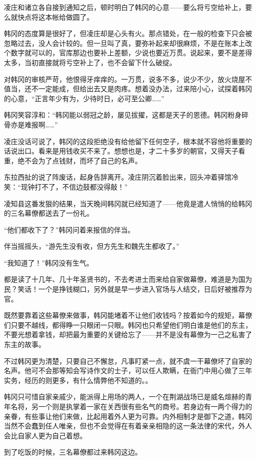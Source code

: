 凌庄和诸立各自接到通知之后，顿时明白了韩冈的心意——要么将亏空给补上，要么就快点将这本帐给做圆了。

韩冈的态度算是很好了，但凌庄却是心头有火。那点错处，在一般的检查下只会被忽略过去，没人会计较的。但一旦叫了真，要弥补起来却很麻烦，不是在账本上改个数字就可以的，官库那边也要补上差额，少说也要近万贯。说起来，要不是差得太多，当初直接就将亏空补上了，也不会留下什么破绽。

对韩冈的审核严苛，他恨得牙痒痒的。一万贯，说多不多，说少不少，放火烧屋不值当，还不一定能成，但给出去又是肉疼。想着没办法，过来陪小心，试探着韩冈的心意，“正言年少有为，少待时日，必可至公卿……”

韩冈笑容淳和：“韩冈能以弱冠之龄，屡见拔擢，这都是天子的恩德。韩冈粉身碎骨亦是难报啊……”

凌庄没话可说了，韩冈的这段拒绝没有给他留下任何空子，根本就不容他将重要的话说出口。看来是用钱收买不来了。想想也是，才二十多岁的朝官，又得天子看重，绝不会为了点钱财，而坏了自己的名声。

东拉西扯的说了阵废话，起身告辞离开。凌庄阴沉着脸出来，回头冲着驿馆冷笑：“现钟打不了，不信边鼓都没得敲！”

凌知县这番发狠的结果，当天晚间韩冈就已经知道了——他竟是遣人悄悄的给韩冈的三名幕僚都送去了一份礼。

“他们都收下了？”韩冈问着来报信的伴当。

伴当摇摇头，“游先生没有收，但方先生和魏先生都收了。”

“我知道了！”韩冈没有生气。

都是读了十几年、几十年圣贤书的，不去考进士而来给自家做幕僚，难道是为国为民？笑话！一个是挣钱糊口，另外就是早一步进入官场与人结交，日后好被推荐为官。

既然要靠着这些幕僚来做事，韩冈能堵着不让他们收钱吗？按着如今的规矩，幕僚们只要不越线，都得睁一只眼闭一只眼。韩冈也只希望他们明白谁是他们的东主，不要光想着拿钱，却把最为重要的关键给忘了——并不是没有幕僚为一己之私害了东主的故事。

不过韩冈更为清楚，只要自己不懈怠，凡事盯紧一点，就不虞一干幕僚坏了自家的名声。他可不会那等知会写诗作文的士子，可以任人欺瞒，在衙门中用心做了三年实务，经历的则更多，有什么情弊他不知道的。。

韩冈只可惜自家亲戚少，能派得上用场的两人，一个在荆湖战场已是威名煊赫的青年名将，另一个则是执掌着一家在关西很有些名气的商号。若身边有一两个得力的亲眷，有些事让他们来做，比起用着外人更为可靠。内外相制才是御下之道，韩冈当然不会蠢到任人唯亲，但也不会觉得在有着亲亲相隐的这一条法律的宋代，外人会比自家人更为自己着想。

到了吃饭的时候，三名幕僚都过来韩冈这边。

